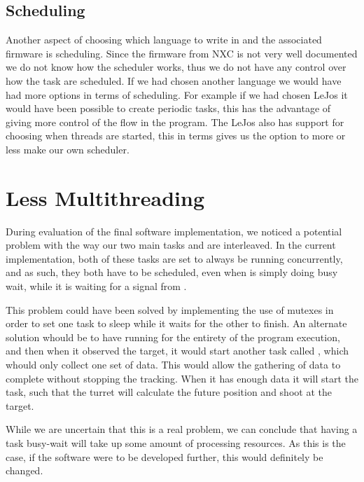 \subsection{Scheduling}
Another aspect of choosing which language to write in and the associated
firmware is scheduling. Since the firmware from NXC is not very well documented
we do not know how the scheduler works, thus we do not have any control over how
the task are scheduled. If we had chosen another language we would have had more
options in terms of scheduling. For example if we had chosen LeJos it would have
been possible to create periodic tasks, this has the advantage of giving more
control of the flow in the program. The LeJos also has support for choosing when
threads are started, this in terms gives us the option to more or less make our
own scheduler.


\section{Less Multithreading}

During evaluation of the final software implementation, we noticed a potential
problem with the way our two main tasks  and
 are interleaved. In the current implementation, both
of these tasks are set to always be running concurrently, and as such, they
both have to be scheduled, even when  is simply doing
busy wait, while it is waiting for a signal from .\nl

This problem could have been solved by implementing the use of mutexes in order
to set one task to sleep while it waits for the other to finish. An alternate
solution whould be to have  running for the entirety of the program
execution, and then when it observed the target, it would start another task
called , which whould only collect one set of data. This would
allow the gathering of data to complete without stopping the tracking. When it
has enough data it will start the  task, such that
the turret will calculate the future position and shoot at the target.\nl

While we are uncertain that this is a real problem, we can conclude that having
a task busy-wait will take up some amount of processing resources. As this is
the case, if the \name software were to be developed further, this would
definitely be changed.
